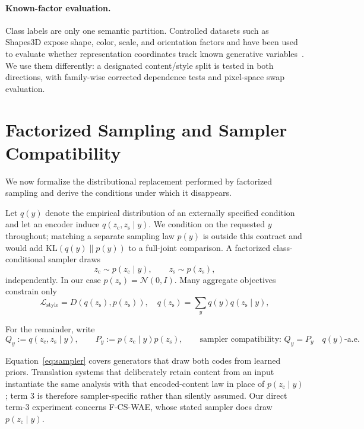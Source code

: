 \documentclass{article}
\newcommand{\zc}{z_{\mathrm{c}}}
\newcommand{\zs}{z_{\mathrm{s}}}
\newcommand{\KL}{\mathrm{KL}}
\begin{document}
\paragraph{Known-factor evaluation.}
Class labels are only one semantic partition.  Controlled datasets such as
Shapes3D expose shape, color, scale, and orientation factors and have been
used to evaluate whether representation coordinates track known generative
variables~\citep{higgins2017beta,locatello2019challenging,deepmind2018shapes3d}.
We use them differently: a designated content/style split is tested in both
directions, with family-wise corrected dependence tests and pixel-space swap
evaluation.

\section{Factorized Sampling and Sampler Compatibility}
\label{sec:theory}

We now formalize the distributional replacement performed by factorized
sampling and derive the conditions under which it disappears.

Let $q(y)$ denote the empirical distribution of an externally specified
condition and let an encoder induce $q(\zc,\zs\mid y)$.  We condition on the
requested $y$ throughout; matching a separate sampling law $p(y)$ is outside
this contract and would add $\KL(q(y)\|p(y))$ to a full-joint comparison.  A
factorized class-conditional sampler draws
\begin{equation}
    \zc\sim p(\zc\mid y),\qquad \zs\sim p(\zs),
    \label{eq:sampler}
\end{equation}
independently.  In our case $p(\zs)=\mathcal N(0,I)$.  Many aggregate
objectives constrain only
\begin{equation}
    \mathcal L_{\mathrm{style}}=D\!\left(q(\zs),p(\zs)\right),
    \quad q(\zs)=\sum_y q(y)q(\zs\mid y),
    \label{eq:global-style}
\end{equation}

For the remainder, write
\begin{equation}
Q_y:=q(\zc,\zs\mid y),\qquad
P_y:=p(\zc\mid y)p(\zs),\qquad
\boxed{\text{sampler compatibility: }Q_y=P_y\quad q(y)\text{-a.e.}}
\label{eq:compatibility}
\end{equation}

Equation~\ref{eq:sampler} covers generators that draw both codes from learned
priors.  Translation systems that deliberately retain content from an input
instantiate the same analysis with that encoded-content law in place of
$p(\zc\mid y)$; term 3 is therefore sampler-specific rather than silently
assumed.  Our direct term-3 experiment concerns F-CS-WAE, whose stated sampler
does draw $p(\zc\mid y)$.
\end{document}

